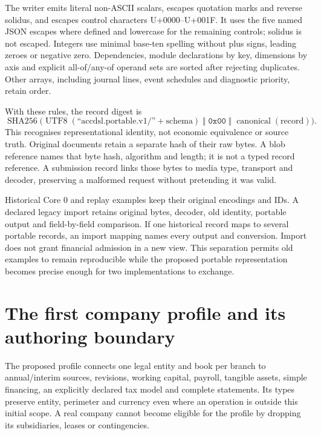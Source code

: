 The writer emits literal non-ASCII scalars, escapes quotation marks and reverse
solidus, and escapes control characters U+0000--U+001F. It uses the five named
JSON escapes where defined and lowercase  for the
remaining controls; solidus is not escaped. Integers use minimal base-ten
spelling without plus signs, leading zeroes or negative zero. Dependencies,
module declarations by key, dimensions by axis and explicit all-of/any-of
operand sets are sorted after rejecting duplicates. Other arrays, including
journal lines, event schedules and diagnostic priority, retain order.

With these rules, the record digest is
\[
\operatorname{SHA256}\bigl(
 \operatorname{UTF8}(\text{``accdsl.portable.v1/''}+\text{schema})
 \;\Vert\;\texttt{0x00}\;\Vert\;\operatorname{canonical}(\text{record})\bigr).
\]
This recognises representational identity, not economic equivalence or source
truth. Original documents retain a separate hash of their raw bytes. A blob
reference names that byte hash, algorithm and length; it is not a typed record
reference. A submission record links those bytes to media type, transport and
decoder, preserving a malformed request without pretending it was valid.

Historical Core 0 and replay examples keep their original encodings and IDs.
A declared legacy import retains original bytes, decoder, old identity, portable
output and field-by-field comparison. If one historical record maps to several
portable records, an import mapping names every output and conversion. Import
does not grant financial admission in a new view. This separation permits old
examples to remain reproducible while the proposed portable representation
becomes precise enough for two implementations to exchange.

\section{The first company profile and its authoring boundary}

The proposed  profile connects one legal entity and
book per branch to annual/interim sources, revisions, working capital, payroll,
tangible assets, simple financing, an explicitly declared tax model and complete
statements. Its types preserve entity, perimeter and currency even where an
operation is outside this initial scope. A real company cannot become eligible
for the profile by dropping its subsidiaries, leases or contingencies.

